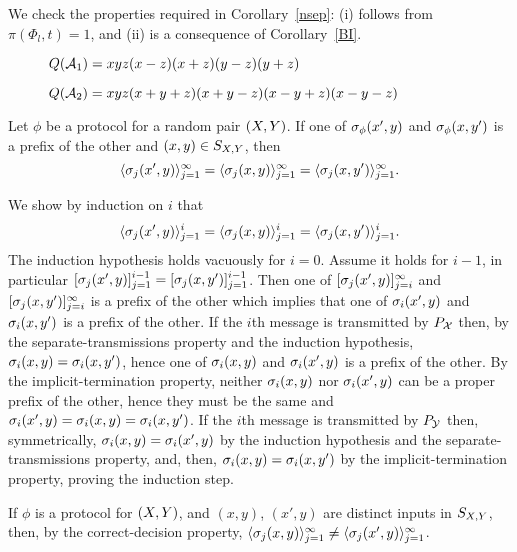 \begin{pf}
We check the properties required in Corollary~\ref{nsep}:
(i) follows from $\pi (\Phi_{ l},t) = 1$, and (ii) is a
consequence of Corollary~\ref{BI}.
\end{pf}

\begin{figure}
\vspace{5cm}
\caption{$Q({\cal A}_{1}) = xyz(x-z)(x+z)(y-z)(y+z)$}
\end{figure}

\begin{figure}
\vspace{5cm}
\caption{$Q({\cal A}_{2})= xyz(x+y+z)(x+y-z)(x-y+z)(x-y-z)$}
\end{figure}


\begin{thm}
\label{T_first_the_int}
Let $\phi$ be a protocol for a random pair ${(X,Y)}$.
If one of $\sigma_\phi(x',y)$ and $\sigma_\phi(x,y')$ is a prefix of the other
and $(x,y)\in{S_{X,Y}}$, then
\[
\langle \sigma_j(x',y)\rangle_{j=1}^\infty
=\langle \sigma_j(x,y)\rangle_{j=1}^\infty
=\langle \sigma_j(x,y')\rangle_{j=1}^\infty .
\]
\end{thm}
\begin{pf}
We show by induction on $i$ that
\[
\langle \sigma_j(x',y)\rangle_{j=1}^i
=\langle \sigma_j(x,y)\rangle_{j=1}^i
=\langle \sigma_j(x,y')\rangle_{j=1}^i.
\]
The induction hypothesis holds vacuously for $i=0$.
Assume it holds for $i-1$, in particular
$[\sigma_j(x',y)]_{j=1}^{i-1}=[\sigma_j(x,y')]_{j=1}^{i-1}$.
Then one of $[\sigma_j(x',y)]_{j=i}^{\infty}$ and $[\sigma_j(x,y')]_{j=i}^{\infty}$
is a prefix of the other which implies that
one of $\sigma_i(x',y)$ and $\sigma_i(x,y')$ is a prefix of the other.
If the $i$th message is transmitted by ${P_{\cal X}}$ then,
by the separate-transmissions property and the induction hypothesis,
$\sigma_i(x,y)=\sigma_i(x,y')$,
hence one of $\sigma_i(x,y)$ and $\sigma_i(x',y)$ is a prefix of the other.
By the implicit-termination property, neither $\sigma_i(x,y)$ nor $\sigma_i(x',y)$
can be a proper prefix of the other, hence they must be the same and
$\sigma_i(x',y)=\sigma_i(x,y)=\sigma_i(x,y')$.
If the $i$th message is transmitted by ${P_{\cal Y}}$ then, symmetrically,
$\sigma_i(x,y)=\sigma_i(x',y)$
by the induction hypothesis and the separate-transmissions property, and, then,
$\sigma_i(x,y)=\sigma_i(x,y')$ by the implicit-termination property,
proving the induction step.
\end{pf}

If $\phi$ is a protocol for ${(X,Y)}$, and $(x,y)$, $(x',y)$ are distinct
inputs in ${S_{X,Y}}$, then, by the correct-decision property,
$\langle\sigma_j(x,y)\rangle_{j=1}^\infty\ne\langle \sigma_j(x',y)\rangle_{j=1}^\infty$.

